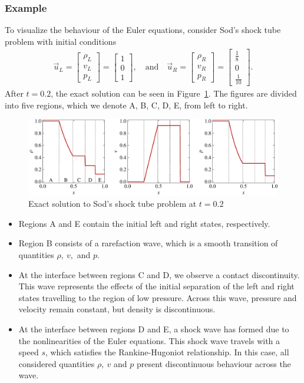 \subsubsection{Example}
To visualize the behaviour of the Euler equations, consider Sod's shock tube problem with initial conditions
\begin{align}
	\vec u_L = 
	\begin{bmatrix}
		\rho_L \\ v_L \\ p_L 
	\end{bmatrix}
	= 
	\begin{bmatrix}
		1 \\ 0 \\ 1
	\end{bmatrix},
	\quad \text{and} \quad 
	\vec u_R = 
	\begin{bmatrix}
		\rho_R \\ v_R \\ p_R
	\end{bmatrix}
	= 
	\begin{bmatrix}
		\frac{1}{8} \\ 0 \\ \frac{1}{10}
	\end{bmatrix}.
\end{align}
After $t=0.2$, the exact solution can be seen in Figure~\ref{fig:shocktubesol}. The figures are divided into five regions, which we denote A, B, C, D, E, from left to right. 
\begin{figure}[htbp]
	\centering
	\includegraphics[width=\linewidth]{Pictures/sod_shock_tube_solution}
	\caption{Exact solution to Sod's shock tube problem at $t=0.2$}
	\label{fig:shocktubesol}
\end{figure}
\begin{itemize}
	\item Regions A and E contain the initial left and right states, respectively.
	\item Region B consists of a rarefaction wave, which is a smooth transition of quantities $\rho,~v,$ and $p$. 
	\item At the interface between regions C and D, we observe a contact discontinuity. This wave represents the effects of the initial separation of the left and right states travelling to the region of low pressure. Across this wave, pressure and velocity remain constant, but density is discontinuous.
	\item At the interface between regions D and E, a shock wave has formed due to the nonlinearities of the Euler equations. This shock wave travels with a speed $s$, which satisfies the Rankine-Hugoniot relationship. In this case, all considered quantities $\rho,~v$ and $p$ present discontinuous behaviour across the wave. 
\end{itemize}

